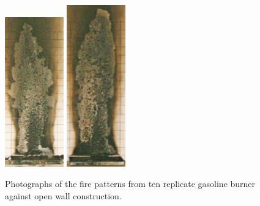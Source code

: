 \documentclass[twoside]{uocthesis}
\begin{document}
{\begin{figure}[p]
	\includegraphics[width=1.0in]{../Figures/GBGAS_33_IMG_6326}
	\includegraphics[width=1.0in]{../Figures/GBGAS_34_IMG_6345} \\

	\caption[Photographs of the fire patterns from ten replicate gasoline burner against open wall construction]{Photographs of the fire patterns from ten replicate gasoline burner against open wall construction.}
	\label{Gas_Open_Wall}
\end{figure}


}
\end{document}
